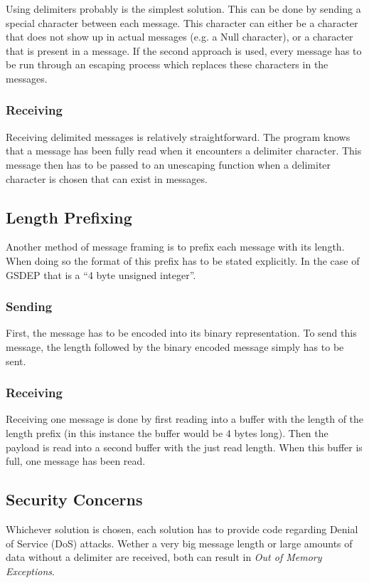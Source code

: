 Using delimiters probably is the simplest solution. This can be done by sending a special character between each message. This character can either be a character that does not show up in actual messages (e.g. a Null character), or a character that is present in a message. If the second approach is used, every message has to be run through an escaping process which replaces these characters in the messages.

\subsubsection{Receiving}

Receiving delimited messages is relatively straightforward. The program knows that a message has been fully read when it encounters a delimiter character. This message then has to be passed to an unescaping function when a delimiter character is chosen that can exist in messages.

\subsection{Length Prefixing}

Another method of message framing is to prefix each message with its length. When doing so the format of this prefix has to be stated explicitly. In the case of GSDEP that is a ``4 byte unsigned integer''.

\subsubsection{Sending}

First, the message has to be encoded into its binary representation. To send this message, the length followed by the binary encoded message simply has to be sent.

\subsubsection{Receiving}

Receiving one message is done by first reading into a buffer with the length of the length prefix (in this instance the buffer would be 4 bytes long). Then the payload is read into a second buffer with the just read length. When this buffer is full, one message has been read.

\subsection{Security Concerns}

Whichever solution is chosen, each solution has to provide code regarding Denial of Service (DoS) attacks. Wether a very big message length or large amounts of data without a delimiter are received, both can result in \textit{Out of Memory Exceptions}.
